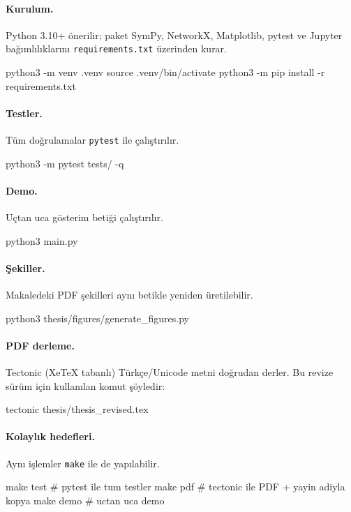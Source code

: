 \documentclass[10pt]{math}
\numberwithin{equation}{section}
\theoremstyle{plain}
\theoremstyle{definition}
\begin{document}
\paragraph{Kurulum.} Python 3.10+ önerilir; paket SymPy, NetworkX, Matplotlib,
pytest ve Jupyter bağımlılıklarını \texttt{requirements.txt} üzerinden kurar.
\begin{bashcode}
python3 -m venv .venv
source .venv/bin/activate
python3 -m pip install -r requirements.txt
\end{bashcode}

\paragraph{Testler.} Tüm doğrulamalar \texttt{pytest} ile çalıştırılır.
\begin{bashcode}
python3 -m pytest tests/ -q
\end{bashcode}

\paragraph{Demo.} Uçtan uca gösterim betiği çalıştırılır.
\begin{bashcode}
python3 main.py
\end{bashcode}

\paragraph{Şekiller.} Makaledeki PDF şekilleri aynı betikle yeniden üretilebilir.
\begin{bashcode}
python3 thesis/figures/generate_figures.py
\end{bashcode}

\paragraph{PDF derleme.} Tectonic (XeTeX tabanlı) Türkçe/Unicode metni doğrudan
derler. Bu revize sürüm için kullanılan komut şöyledir:
\begin{bashcode}
tectonic thesis/thesis_revised.tex
\end{bashcode}

\paragraph{Kolaylık hedefleri.} Aynı işlemler \texttt{make} ile de yapılabilir.
\begin{bashcode}
make test    # pytest ile tum testler
make pdf     # tectonic ile PDF + yayin adiyla kopya
make demo    # uctan uca demo
\end{bashcode}
\end{document}
